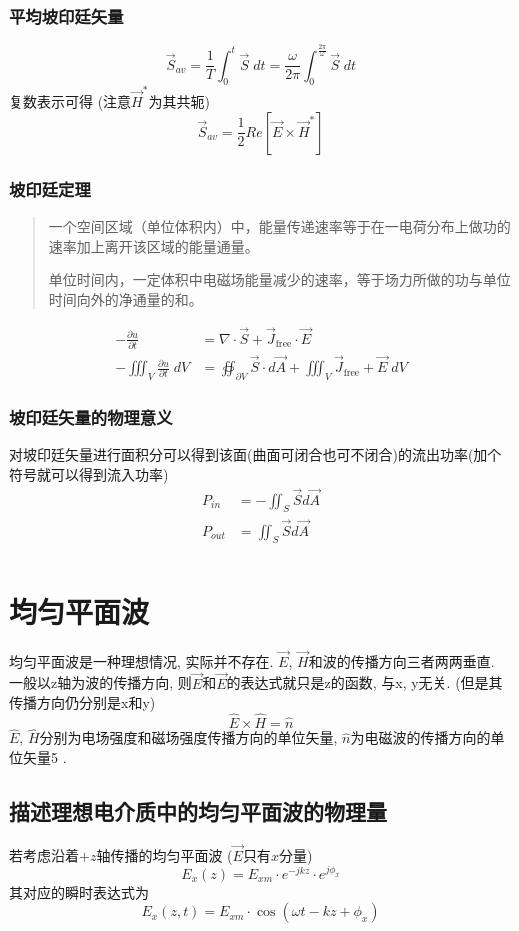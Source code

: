 \documentclass[a4paper]{report}
\begin{document}
\subsection{平均坡印廷矢量}
$$\vec{S}_{av}=\frac{1}{T}\int_0^t \vec{S}\;dt=\frac{\omega}{2\pi}\int_0^{\frac{2\pi}{\omega}} \vec{S}\;dt$$
复数表示可得 (注意$\vec{H}^\ast $为其共轭)
$$\vec{S}_{av}=\frac{1}{2} Re[\vec{E}\times \vec{H}^\ast ]$$
\subsection{坡印廷定理}
\begin{quotation}
    一个空间区域（单位体积内）中，能量传递速率等于在一电荷分布上做功的速率加上离开该区域的能量通量。
    
    单位时间内，一定体积中电磁场能量减少的速率，等于场力所做的功与单位时间向外的净通量的和。
\end{quotation}

\begin{align*}
    - \frac{\partial u }{\partial t}&=\nabla\cdot \vec{S}+\vec{J}_\text{free}\cdot\vec{E} \\
    -\iiint_V \frac{\partial u }{\partial t}\; dV&=\oiint_{\partial V}\vec{S}\cdot d\vec{A}+\iiint_V \vec{J}_\text{free}+\vec{E}\; dV
\end{align*}
\subsection{坡印廷矢量的物理意义}
对坡印廷矢量进行面积分可以得到该面(曲面可闭合也可不闭合)的流出功率(加个符号就可以得到流入功率)
\begin{align*}
    P_{in}&=-\iint_S \vec{S} d\vec{A}\\
    P_{out}&=\iint_S \vec{S} d\vec{A}\\
\end{align*}
\chapter{均匀平面波}
均匀平面波是一种理想情况, 实际并不存在. 
$\vec{E}$, $\vec{H}$和波的传播方向三者两两垂直. 一般以z轴为波的传播方向, 则$\vec{E}$和$\vec{E}$的表达式就只是z的函数, 与x, y无关. (但是其传播方向仍分别是x和y)
$$\hat{E}\times\hat{H}=\hat{n}$$
$\hat{E}$, $\hat{H}$分别为电场强度和磁场强度传播方向的单位矢量, $\hat{n}$为电磁波的传播方向的单位矢量5  . 
\section{描述理想电介质中的均匀平面波的物理量}
若考虑沿着$+z$轴传播的均匀平面波 ($\vec{E} $只有$x$分量)
$$E_x(z)=E_{xm}\cdot e^{-jkz}\cdot e^{j\phi_x}$$
其对应的瞬时表达式为$$E_x(z,t)=E_{xm}\cdot \cos(\omega t-kz+\phi_x)$$
\end{document}
